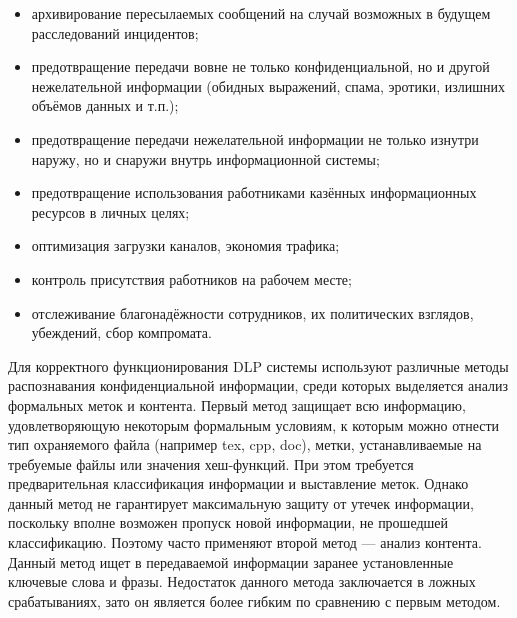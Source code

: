 \begin{itemize}
	\item
		архивирование пересылаемых сообщений на случай возможных в будущем расследований инцидентов;
	\item 
	    предотвращение передачи вовне не только конфиденциальной, но и другой нежелательной информации (обидных выражений, спама, эротики, излишних объёмов данных и т.п.);
	\item
	    предотвращение передачи нежелательной информации не только изнутри наружу, но и снаружи внутрь информационной системы;
	\item
	    предотвращение использования работниками казённых информационных ресурсов в личных целях;
	\item
	    оптимизация загрузки каналов, экономия трафика;
	\item
         контроль присутствия работников на рабочем месте;
	\item
	    отслеживание благонадёжности сотрудников, их политических взглядов, убеждений, сбор компромата.
\end{itemize}


Для корректного функционирования DLP системы используют различные методы распознавания конфиденциальной информации, среди которых выделяется анализ формальных меток и контента. Первый метод защищает всю информацию, удовлетворяющую некоторым формальным условиям, к которым можно отнести тип охраняемого файла (например tex, cpp, doc), метки, устанавливаемые на требуемые файлы или значения хеш-функций. При этом требуется предварительная классификация информации и выставление меток. Однако данный метод не гарантирует максимальную защиту от утечек информации, поскольку вполне возможен пропуск новой информации, не прошедшей классификацию. Поэтому часто применяют второй метод --- анализ контента. Данный метод ищет в передаваемой информации заранее установленные ключевые слова и фразы. Недостаток данного метода заключается в ложных срабатываниях, зато он является более гибким по сравнению с первым методом.


